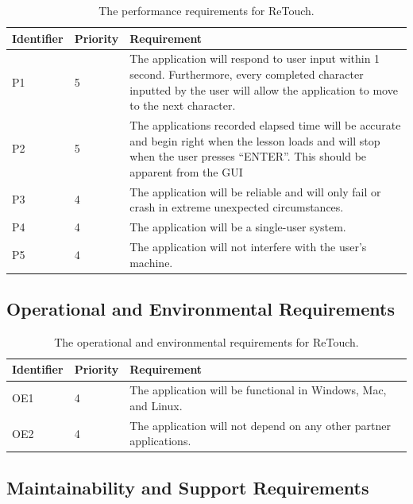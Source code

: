 \documentclass[12pt, titlepage]{article}
\begin{document}
\begin{table}[H]
  \caption{The performance requirements for ReTouch.}
\begin{tabular}{ |m{2cm}|m{1.8cm}|m{9.4cm}| }
    \hline
    \textbf{Identifier} & \textbf{Priority} & \textbf{Requirement} \\ 
    \hline
    {\color{cyan}P1} & 5 & {\color{cyan}The application will respond to user input within 1 second. Furthermore, every completed character inputted by the user will allow the application to move to the next character.} \\
    \hline
    {\color{cyan}P2} & 5 & The applications recorded elapsed time will be accurate and begin right when the lesson loads and will stop when the user presses “ENTER”. {\color{cyan}This should be apparent from the GUI }\\ 
    \hline
    {\color{cyan}P3} & 4 & The application will be reliable and will only fail or crash in extreme unexpected circumstances. \\
    \hline
    {\color{cyan}P4} & 4 & The application will be a single-user system. \\
    \hline
    {\color{cyan}P5} & 4 & The application will not interfere with the user's machine. \\
    \hline
\end{tabular}
\end{table}

\subsection{Operational and Environmental Requirements}

\begin{table}[H]
  \caption{The operational and environmental requirements for ReTouch.}
\begin{tabular}{ |m{2cm}|m{1.8cm}|m{9.4cm}| }
    \hline
    \textbf{Identifier} & \textbf{Priority} & \textbf{Requirement} \\ 
    \hline
    {\color{cyan}OE1} & 4 & The application will be functional in Windows, {\color{cyan}Mac,} and Linux. \\
    \hline
    {\color{cyan}OE2} & 4 & The application will not depend on any other partner applications. \\
    \hline
\end{tabular}
\end{table}

\subsection{Maintainability and Support Requirements}
\end{document}
